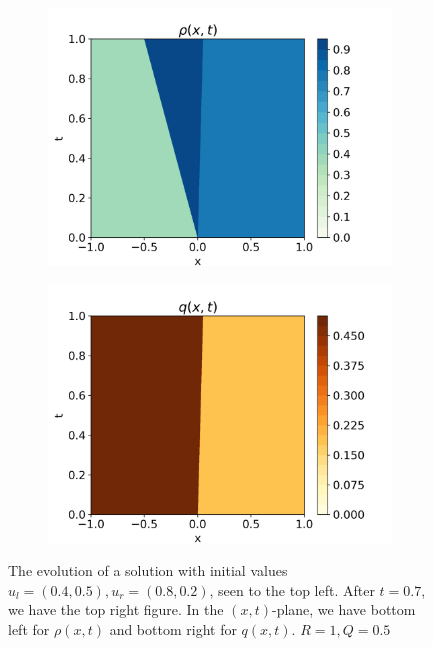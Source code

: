 \documentclass[10pt]{article}
\numberwithin{equation}{section}
\begin{document}
\begin{figure}
\begin{subfigure}[b]{0.35\textwidth}
         \includegraphics[width=\textwidth]{Figures/Model/SysContactsRho.png}
     \end{subfigure}
     \begin{subfigure}[b]{0.35\textwidth}
         \centering
         \includegraphics[width=\textwidth]{Figures/Model/SysContactsQ.png}
     \end{subfigure}
        \caption{The evolution of a solution with initial values $u_l = (0.4, 0.5 ), u_r = (0.8, 0.2)$, seen to the top left. After $t = 0.7$, we have the top right figure. In the $(x,t)$-plane, we have bottom left for $\rho(x,t)$ and bottom right for $q(x,t)$. $R = 1, Q = 0.5$}
        \label{fig:ExampleSysContact}

\end{figure}
\end{document}
